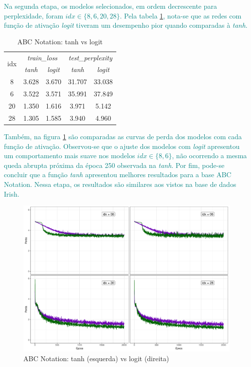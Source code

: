 \documentclass{automatextcc}
\newcommand{\nico}[1]{\textcolor{teal}{#1}}
\begin{document}
\nico{
Na segunda etapa, os modelos selecionados, em ordem decrescente para perplexidade, foram $idx \in \{8,6,20,28\}$. Pela tabela \ref{fig:abcnotation_tanh_vs_logit}, nota-se que as redes com função de ativação \textit{logit} tiveram um desempenho pior quando comparadas à \textit{tanh}.
}
\begin{table}
    \label{fig:abcnotation_tanh_vs_logit}
    \caption{ABC Notation: tanh vs logit}
    \centering
    \begin{tabular}{c|cc|cc}
        \toprule
        \multirow{2}{*}{idx} &
        \multicolumn{2}{c}{\textit{train\_loss}} &
        \multicolumn{2}{c}{\textit{test\_perplexity}} \\
        & {\textit{tanh}} & {\textit{logit}} & {\textit{tanh}} & {\textit{logit}} \\
        \midrule
        8 & 3.628 & 3.670 & 31.707 & 33.038 \\
        6 & 3.522 & 3.571 & 35.991 & 37.849 \\
        20 & 1.350 & 1.616 & 3.971 & 5.142 \\
        28 & 1.305 & 1.585 & 3.940 & 4.960 \\
    \bottomrule
  \end{tabular}
\end{table}
%
\nico{
Também, na figura \ref{fig:abcnotation_tanh_vs_logit} são comparadas as curvas de perda dos modelos com cada função de ativação. Observou-se que o ajuste dos modelos com \textit{logit} apresentou um comportamento mais suave nos modelos $idx \in \{8,6\}$, não ocorrendo a mesma queda abrupta próxima da época 250 observada na \textit{tanh}. Por fim, pode-se concluir que a função \textit{tanh} apresentou melhores resultados para a base ABC Notation. Nessa etapa, os resultados são similares aos vistos na base de dados Irish. 
}
\begin{figure}
    \label{fig:abcnotation_tanh_vs_logit}
    \centering
    \includegraphics[width=\textwidth]{abcnotation_tanh_vs_logit.pdf}
    \caption{ABC Notation: tanh (esquerda) vs logit (direita)}
\end{figure}
\end{document}
